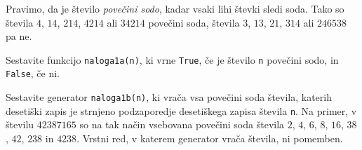 \documentclass[arhiv]{izpit}
\begin{document}

\naloga[30 točk]

Pravimo, da je število \emph{povečini sodo}, kadar vsaki lihi števki sledi soda.
Tako so števila $4$, $14$, $214$, $4214$ ali $34214$ povečini soda,
števila $3$, $13$, $21$, $314$ ali $246538$ pa ne.

\podnaloga[20 točk]
  Sestavite funkcijo \verb|naloga1a(n)|, ki vrne
    \verb|True|, če je število \verb|n| povečini sodo,
    in \verb|False|, če ni.

\podnaloga[10 točk]
  Sestavite generator \verb|naloga1b(n)|, ki vrača vsa povečini soda števila,
  katerih desetiški zapis je strnjeno podzaporedje desetiškega zapisa števila \verb|n|.
  Na primer, v številu $42387165$ so na tak način vsebovana povečini soda števila
  $2$, $4$, $6$, $8$, $16$, $38$, $42$, $238$ in $4238$.
  Vrstni red, v katerem generator vrača števila, ni pomemben.

\naloga[25 točk]
\end{document}
